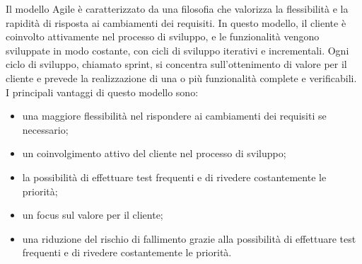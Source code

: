 Il modello Agile è caratterizzato da una filosofia che valorizza la flessibilità e la rapidità
di risposta ai cambiamenti dei requisiti. In questo modello, il cliente è coinvolto attivamente
nel processo di sviluppo, e le funzionalità vengono sviluppate in modo costante, con cicli di sviluppo
iterativi e incrementali. Ogni ciclo di sviluppo, chiamato sprint, si concentra sull'ottenimento
di valore per il cliente e prevede la realizzazione di una o più funzionalità complete e verificabili.
I principali vantaggi di questo modello sono:
\begin{itemize}
    \item una maggiore flessibilità nel rispondere ai cambiamenti dei requisiti se necessario;
    \item un coinvolgimento attivo del cliente nel processo di sviluppo;
    \item la possibilità di effettuare test frequenti e di rivedere costantemente le priorità;
    \item un focus sul valore per il cliente;
    \item una riduzione del rischio di fallimento grazie alla possibilità di effettuare test frequenti e di rivedere costantemente le priorità.
\end{itemize}